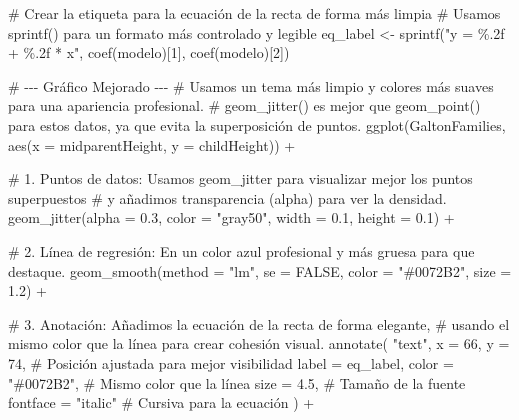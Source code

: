 \documentclass[
  letterpaper,
  DIV=11,
  numbers=noendperiod]{scrreprt}
\newenvironment{Shaded}{\begin{snugshade}}{\end{snugshade}}
\newcommand{\AttributeTok}[1]{\textcolor[rgb]{0.40,0.45,0.13}{#1}}
\newcommand{\CommentTok}[1]{\textcolor[rgb]{0.37,0.37,0.37}{#1}}
\newcommand{\ConstantTok}[1]{\textcolor[rgb]{0.56,0.35,0.01}{#1}}
\newcommand{\DecValTok}[1]{\textcolor[rgb]{0.68,0.00,0.00}{#1}}
\newcommand{\FloatTok}[1]{\textcolor[rgb]{0.68,0.00,0.00}{#1}}
\newcommand{\FunctionTok}[1]{\textcolor[rgb]{0.28,0.35,0.67}{#1}}
\newcommand{\NormalTok}[1]{\textcolor[rgb]{0.00,0.23,0.31}{#1}}
\newcommand{\OtherTok}[1]{\textcolor[rgb]{0.00,0.23,0.31}{#1}}
\newcommand{\SpecialCharTok}[1]{\textcolor[rgb]{0.37,0.37,0.37}{#1}}
\newcommand{\StringTok}[1]{\textcolor[rgb]{0.13,0.47,0.30}{#1}}
\begin{document}
\begin{tcolorbox}
\begin{Shaded}
\begin{Highlighting}[]
\CommentTok{\# Crear la etiqueta para la ecuación de la recta de forma más limpia}
\CommentTok{\# Usamos sprintf() para un formato más controlado y legible}
\NormalTok{eq\_label }\OtherTok{\textless{}{-}} \FunctionTok{sprintf}\NormalTok{(}\StringTok{"y = \%.2f + \%.2f * x"}\NormalTok{, }\FunctionTok{coef}\NormalTok{(modelo)[}\DecValTok{1}\NormalTok{], }\FunctionTok{coef}\NormalTok{(modelo)[}\DecValTok{2}\NormalTok{])}

\CommentTok{\# {-}{-}{-} Gráfico Mejorado {-}{-}{-}}
\CommentTok{\# Usamos un tema más limpio y colores más suaves para una apariencia profesional.}
\CommentTok{\# geom\_jitter() es mejor que geom\_point() para estos datos, ya que evita la superposición de puntos.}
\FunctionTok{ggplot}\NormalTok{(GaltonFamilies, }\FunctionTok{aes}\NormalTok{(}\AttributeTok{x =}\NormalTok{ midparentHeight, }\AttributeTok{y =}\NormalTok{ childHeight)) }\SpecialCharTok{+}
  
  \CommentTok{\# 1. Puntos de datos: Usamos geom\_jitter para visualizar mejor los puntos superpuestos}
  \CommentTok{\#    y añadimos transparencia (alpha) para ver la densidad.}
  \FunctionTok{geom\_jitter}\NormalTok{(}\AttributeTok{alpha =} \FloatTok{0.3}\NormalTok{, }\AttributeTok{color =} \StringTok{"gray50"}\NormalTok{, }\AttributeTok{width =} \FloatTok{0.1}\NormalTok{, }\AttributeTok{height =} \FloatTok{0.1}\NormalTok{) }\SpecialCharTok{+}
  
  \CommentTok{\# 2. Línea de regresión: En un color azul profesional y más gruesa para que destaque.}
  \FunctionTok{geom\_smooth}\NormalTok{(}\AttributeTok{method =} \StringTok{"lm"}\NormalTok{, }\AttributeTok{se =} \ConstantTok{FALSE}\NormalTok{, }\AttributeTok{color =} \StringTok{"\#0072B2"}\NormalTok{, }\AttributeTok{size =} \FloatTok{1.2}\NormalTok{) }\SpecialCharTok{+}
  
  \CommentTok{\# 3. Anotación: Añadimos la ecuación de la recta de forma elegante,}
  \CommentTok{\#    usando el mismo color que la línea para crear cohesión visual.}
  \FunctionTok{annotate}\NormalTok{(}
    \StringTok{"text"}\NormalTok{,}
    \AttributeTok{x =} \DecValTok{66}\NormalTok{, }\AttributeTok{y =} \DecValTok{74}\NormalTok{, }\CommentTok{\# Posición ajustada para mejor visibilidad}
    \AttributeTok{label =}\NormalTok{ eq\_label,}
    \AttributeTok{color =} \StringTok{"\#0072B2"}\NormalTok{, }\CommentTok{\# Mismo color que la línea}
    \AttributeTok{size =} \FloatTok{4.5}\NormalTok{, }\CommentTok{\# Tamaño de la fuente}
    \AttributeTok{fontface =} \StringTok{"italic"} \CommentTok{\# Cursiva para la ecuación}
\NormalTok{  ) }\SpecialCharTok{+}
  

\end{Highlighting}
\end{Shaded}
\end{tcolorbox}
\end{document}
